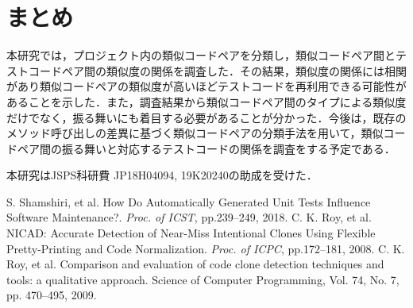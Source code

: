 \documentclass{fose2019}           %
\begin{document}
\section{まとめ}
本研究では，プロジェクト内の類似コードペアを分類し，類似コードペア間とテストコードペア間の類似度の関係を調査した．その結果，類似度の関係には相関があり類似コードペアの類似度が高いほどテストコードを再利用できる可能性があることを示した．また，調査結果から類似コードペア間のタイプによる類似度だけでなく，振る舞いにも着目する必要があることが分かった．今後は，既存のメソッド呼び出しの差異に基づく類似コードペアの分類手法を用いて，類似コードペア間の振る舞いと対応するテストコードの関係を調査をする予定である．
%

\acknowledgements{}
本研究はJSPS科研費 JP18H04094, 19K20240の助成を受けた．


\begin{thebibliography}{2}
 S. Shamshiri, et al. How Do Automatically Generated Unit Tests Influence Software Maintenance?. {\it Proc. of ICST}, pp.239--249, 2018. 
 C. K. Roy, et al. NICAD: Accurate Detection of Near-Miss Intentional Clones Using Flexible Pretty-Printing and Code Normalization. {\it Proc. of ICPC}, pp.172--181, 2008.
 C. K. Roy, et al. Comparison and evaluation of code clone detection techniques and tools: a qualitative approach. Science of Computer Programming, Vol. 74, No. 7, pp. 470–495, 2009.
\end{thebibliography}
\end{document}
